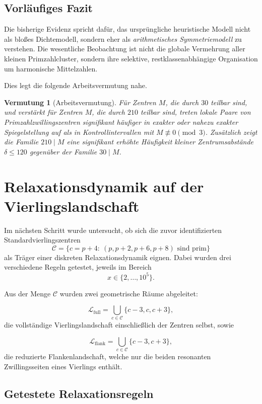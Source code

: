 \documentclass[11pt,a4paper]{article}
\theoremstyle{definition}
\theoremstyle{plain}
\newtheorem{conjecture}[definition]{Vermutung}
\theoremstyle{remark}
\begin{document}
	\subsection{Vorläufiges Fazit}
	
	Die bisherige Evidenz spricht dafür, das ursprüngliche heuristische Modell nicht als bloßes Dichtemodell, sondern eher als \emph{arithmetisches Symmetriemodell} zu verstehen. 
	Die wesentliche Beobachtung ist nicht die globale Vermehrung aller kleinen Primzahlcluster, sondern ihre selektive, restklassenabhängige Organisation um harmonische Mittelzahlen.
	
	Dies legt die folgende Arbeitsvermutung nahe.
	
	\begin{conjecture}[Arbeitsvermutung]
		Für Zentren $M$, die durch $30$ teilbar sind, und verstärkt für Zentren $M$, die durch $210$ teilbar sind, treten lokale Paare von Primzahlzwillingszentren signifikant häufiger in exakter oder nahezu exakter Spiegelstellung auf als in Kontrollintervallen mit $M\not\equiv 0\pmod{3}$. 
		Zusätzlich zeigt die Familie $210\mid M$ eine signifikant erhöhte Häufigkeit kleiner Zentrumsabstände $\delta\le 120$ gegenüber der Familie $30\mid M$.
	\end{conjecture}
	
	\section{Relaxationsdynamik auf der Vierlingslandschaft}
	
	Im nächsten Schritt wurde untersucht, ob sich die zuvor identifizierten Standardvierlingszentren
	\[
	\mathcal C=\{c=p+4:\ (p,p+2,p+6,p+8)\text{ sind prim}\}
	\]
	als Träger einer diskreten Relaxationsdynamik eignen. 
	Dabei wurden drei verschiedene Regeln getestet, jeweils im Bereich
	\[
	x\in\{2,\dots,10^5\}.
	\]
	
	Aus der Menge \(\mathcal C\) wurden zwei geometrische Räume abgeleitet:
	
	\[
	\mathcal L_{\mathrm{full}}
	=
	\bigcup_{c\in\mathcal C}\{c-3,c,c+3\},
	\]
	die vollständige Vierlingslandschaft einschließlich der Zentren selbst, sowie
	
	\[
	\mathcal L_{\mathrm{flank}}
	=
	\bigcup_{c\in\mathcal C}\{c-3,c+3\},
	\]
	die reduzierte Flankenlandschaft, welche nur die beiden resonanten Zwillingsseiten eines Vierlings enthält.
	
	\subsection{Getestete Relaxationsregeln}
	
\end{document}
